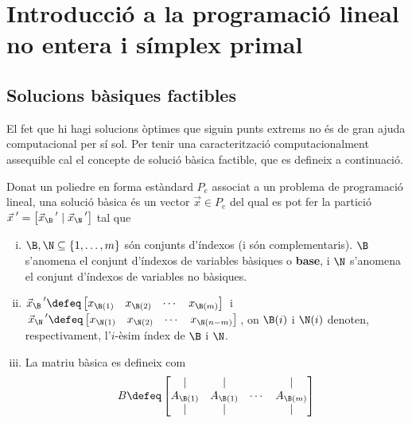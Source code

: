 \chapter[Introducció a la prog. lineal \& símplex primal]%
{Introducció a la programació lineal no entera i símplex primal}

\newcommand{\x}[1][]{{\vec{x}_{#1}\,}'}

\section{Solucions bàsiques factibles}

El fet que hi hagi solucions òptimes que siguin punts extrems no és de gran ajuda computacional per sí sol. Per tenir una caracterització computacionalment assequible cal el concepte de solució bàsica factible, que es defineix a continuació.

\begin{defi*}
	Donat un poliedre en forma estàndard $P_e$ associat a un problema de programació lineal, una solució bàsica és un vector $\vec{x}\in P_e$ del qual es pot fer la partició $\x = \left[\x[\B]\mid\x[\N]\right]$ tal que
	\begin{enumerate}[i)]
		\item $\B,\N\subseteq\{1,\ldots,m \}$ són conjunts d'índexos (i són complementaris). $\B$ s'anomena el conjunt d'índexos de variables bàsiques o \textbf{base}, i $\N$ s'anomena el conjunt d'índexos de variables no bàsiques.
		\item $\x[\B] \defeq 
		\begin{bmatrix}x_{\B(1)} & x_{\B(2)} & \cdots & x_{\B(m)}\end{bmatrix}\,$
		i
		$\,\x[\N] \defeq 
		\begin{bmatrix}x_{\N(1)} & x_{\N(2)} & \cdots & x_{\N(n-m)}\end{bmatrix}\,$, on $\B(i)$ i $\N(i)$ denoten, respectivament, l'$i$-èsim índex de $\B$ i $\N$.
		\item La matriu bàsica es defineix com 
		\[
			B \defeq
			\begin{bmatrix}
			\arrowvert& 	\arrowvert& 	  & 	\arrowvert\\
			A_{\B(1)}&		A_{\B(1)}&	\cdots&		A_{\B(m)}\\
			\arrowvert& 	\arrowvert& 	  & 	\arrowvert\\
			\end{bmatrix}
		\]
	\end{enumerate}
\end{defi*}

